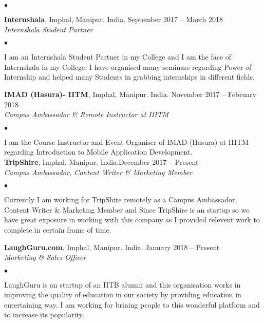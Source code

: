 \documentclass[margin,line]{res}
\newenvironment{list2}{
  \begin{list}{$\bullet$}{%
      \setlength{\itemsep}{0in}
      \setlength{\parsep}{0in} \setlength{\parskip}{0in}
      \setlength{\topsep}{0in} \setlength{\partopsep}{0in}
      \setlength{\leftmargin}{0.2in}}}{\end{list}}
\begin{document}
\begin{resume}
\begin{list2}
\end{list2}

{\bf Internshala}, Imphal, Manipur. India. \hfill{September 2017 -- March 2018}\\
{\em Internshala Student Partner}
\begin{list2} %
\item I am an Internshala Student Partner in my College and I am the face of Internshala in my College. I have organised many seminars regarding Power of Internship and helped many Students in grabbing internships in different fields. \\

\end{list2}
{\bf IMAD (Hasura)- IITM}, Imphal, Manipur. India. \hfill{November 2017 -- February 2018}\\
{\em Campus Ambassador \& Remote Instructor at IIITM}
\begin{list2} %
\item I am the Course Instructor and Event Organiser of IMAD (Hasura) at IIITM regarding Introduction to Mobile Application Development. \\
{\bf TripShire}, Imphal, Manipur. India.\hfill {December 2017 -- Present}\\
{\em Campus Ambassador, Content Writer 
\& Marketing Member}\\
\begin{list2} %
\item  Currently I am working for TripShire remotely as a Campus Ambassador, Content Writer 
\& Marketing Member and Since TripShire is an startup so we have great exposure in working with this company as I provided relevent work to complete in certain frame of time. \\
\end{list2}


\end{list2}
{\bf  LaughGuru.com}, Imphal, Manipur. India. \hfill{January 2018 -- Present}\\
{\em Marketing \& Sales Officer}
\begin{list2} %
\item LaughGuru is an startup of an IITB alumni and this organisation works in improving the quality of education in our society by providing education in entertaining way. I am working for brining people to this wonderful platform and to increase its popularity. \\


\end{list2}
\end{resume}
\end{document}
